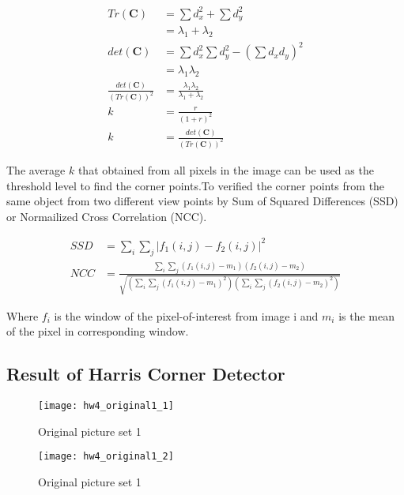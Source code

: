 \documentclass[11pt]{article}
\begin{document}
\begin{align*}
Tr(\mathbf{C}) &= \sum{d^2_x} + \sum{d^2_y} \\ 
&= \lambda_1 + \lambda_2 \\
det(\mathbf{C}) &= \sum{d^2_x}  \sum{d^2_y} - (\sum{d_x d_y})^2 \\ 
&= \lambda_1  \lambda_2 \\
\frac{det(\mathbf{C})}{(Tr(\mathbf{C}))^2} &= \frac{\lambda_1  \lambda_2}{\lambda_1 + \lambda_2} \\
k &= \frac{r}{(1+r)^2} \\
k &= \frac{det(\mathbf{C})}{(Tr(\mathbf{C}))^2}
\end{align*}

The average $k$ that obtained from all pixels in the image can be used as the threshold level to find the corner points.To verified the corner points from the same object from two different view points by Sum of Squared Differences (SSD) or Normailized Cross Correlation (NCC). 

\begin{align*}
SSD &= \sum_i{}\sum_j{|f_1(i, j)-f_2(i, j)|^2} \\
NCC &= \frac{\sum_i{}\sum_j{(f_1(i, j)-m_1)(f_2(i, j)-m_2)}}
{\sqrt{(\sum_i{}\sum_j{(f_1(i, j)-m_1)^2})(\sum_i{}\sum_j{(f_2(i, j)-m_2)^2})}}
\end{align*}

Where $f_i$ is the window of the pixel-of-interest from image i and $m_i$ is the mean of the pixel in corresponding window.


\subsection*{Result of Harris Corner Detector}

\begin{figure}[H]
\centering
\texttt{[image: hw4\_original1\_1]}
\caption{Original picture set 1}
\label{}
\end{figure}
\begin{figure}[H]
\centering
\texttt{[image: hw4\_original1\_2]}
\caption{Original picture set 1}
\label{}
\end{figure}
\end{document}
